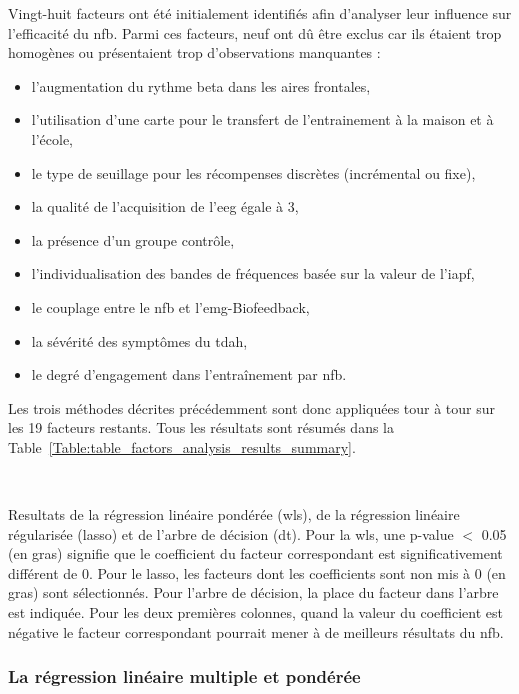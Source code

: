 Vingt-huit facteurs ont été initialement identifiés afin d'analyser leur influence sur l'efficacité du \gls{nfb}. Parmi ces facteurs, neuf ont dû être exclus car ils étaient trop
homogènes ou présentaient trop d'observations manquantes : 
\begin{itemize}
	\item l'augmentation du rythme beta dans les aires frontales,
  \item l'utilisation d'une carte pour le transfert de l'entrainement à la maison et à l'école, 
  \item le type de seuillage pour les récompenses discrètes (incrémental ou fixe),
  \item la qualité de l'acquisition de l'\gls{eeg} égale à 3,
	\item la présence d'un groupe contrôle,
	\item l'individualisation des bandes de fréquences basée sur la valeur de l'\gls{iapf},
	\item le couplage entre le \gls{nfb} et l'\gls{emg}-Biofeedback,
	\item la sévérité des symptômes du \gls{tdah},
	\item le degré d'engagement dans l'entraînement par \gls{nfb}.
\end{itemize} 

Les trois méthodes décrites précédemment sont donc appliquées tour à tour sur les 19 facteurs restants. Tous les résultats sont résumés dans la Table~\ref{Table:table_factors_analysis_results_summary}.

\newpage\
\begin{table}[h!]
  \centering
  \caption{Resultats de la régression linéaire pondérée (\gls{wls}), de la régression linéaire régularisée (\gls{lasso}) et de l'arbre de décision (\gls{dt}). Pour la \gls{wls}, une p-value $<$ 0.05 
	(en gras) signifie que le coefficient du facteur correspondant est significativement différent de 0. Pour le \gls{lasso}, les facteurs dont les coefficients sont non mis à 0 (en gras) sont 
	sélectionnés. Pour l'arbre de décision, la place du facteur dans l'arbre est indiquée. Pour les deux premières colonnes, quand la valeur du coefficient est négative le facteur 
	correspondant pourrait mener à de meilleurs résultats du \gls{nfb}.}
  
  \label{Table:table_factors_analysis_results_summary}
\end{table}

\subsubsection{La régression linéaire multiple et pondérée}

